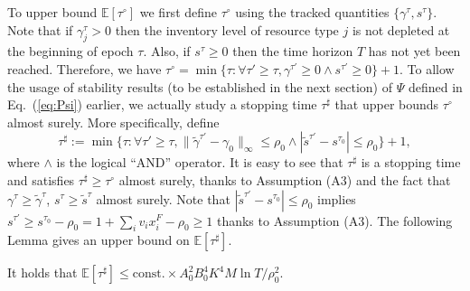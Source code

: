 \documentclass[opre]{informs3aa}
\renewcommand{\tilde}{\widetilde}
\renewcommand{\tilde}{\widetilde}
\newcommand{\const}{\mathrm{const}}
\begin{document}
To upper bound $\mathbb E[\tau^\circ]$ we first define $\tau^\circ$ using the tracked quantities $\{\gamma^\tau,s^\tau\}$.
Note that if {$\gamma^\tau_j>0$} then the inventory level of resource type $j$ is not depleted at the beginning of epoch $\tau$.
Also, if $s^\tau\geq 0$ then the time horizon $T$ has not yet been reached.
Therefore, we have
$\tau^\circ = \min\{\tau: \forall\tau'\geq\tau, \gamma^{\tau'}\geq 0\wedge s^{\tau'}\geq 0\} + 1$.
To allow the usage of stability results (to be established in the next section) of $\Psi$ defined in Eq.~(\ref{eq:Psi}) earlier,
we actually study a stopping time $\tau^\sharp$ that upper bounds $\tau^\circ$ almost surely.
More specifically, define
\begin{equation}
\tau^\sharp := \min\big\{\tau: \forall\tau'\geq\tau, \|\tilde\gamma^{\tau'}-\gamma_0\|_{\infty}\leq\rho_0\wedge |\tilde s^{\tau'}-s^{\tau_0}|\leq \rho_0\big\} + 1,
\label{eq:defn-tausharp}
\end{equation}
{where $\wedge$ is the logical ``AND'' operator.}
It is easy to see that $\tau^\sharp$ is a stopping time and satisfies $\tau^\sharp\geq\tau^\circ$ almost surely, thanks to Assumption (A3)
and the fact that $\gamma^\tau\geq\tilde\gamma^\tau$, $s^\tau\geq\tilde s^\tau$ almost surely.
Note that $|\tilde s^{\tau'}-s^{\tau_0}|\leq\rho_0$ implies $s^{\tau'}\geq s^{\tau_0}-\rho_0 = 1+\sum_i v_ix_i^F-\rho_0\geq 1$ thanks to Assumption (A3).
The following Lemma gives an upper bound on $\mathbb E[\tau^\sharp]$.
\begin{lemma}
It holds that $\mathbb E[\tau^\sharp] \leq  \const.\times A_0^2B_0^4K^4M\ln T/\rho_0^2$.
\label{lem:tausharp-bound}
\end{lemma}
\end{document}
